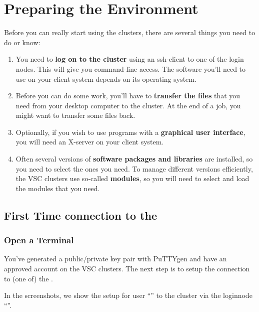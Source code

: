 \chapter{Preparing the Environment}
\label{ch:preparing-the-environment}

Before you can really start using the \hpc clusters, there are several things you need to do or know:

\begin{enumerate}
\item  You need to \textbf{log on to the cluster} using an ssh-client to one of the login nodes. This will give you command-line access. The software you'll need to use on your client system depends on its operating system.
\item  Before you can do some work, you'll have to \textbf{transfer the files} that you need from your desktop computer to the cluster. At the end of a job, you might want to transfer some files back.
\item  Optionally, if you wish to use programs with a \textbf{graphical user interface}, you will need an X-server on your client system.
\item  Often several versions of \textbf{software packages and libraries} are installed, so you need to select the ones you need. To manage different versions efficiently, the VSC clusters use so-called \textbf{modules}, so you will need to select and load the modules that you need.
\end{enumerate}

\section{First Time connection to the \hpc}
\label{sec:first-time-connection-to-the-hpc}

\ifwindows

  \subsection{Open a Terminal}
  \label{sec:windows-open-a-terminal}

  You've generated a public/private key pair with PuTTYgen and have an approved
  account on the VSC clusters.  The next step is to setup the connection to (one
  of) the \hpc.

  In the screenshots, we show the setup for user ``''
  to the \hpc cluster via the loginnode
  ``\strong{\emph{\loginnode}}''.

